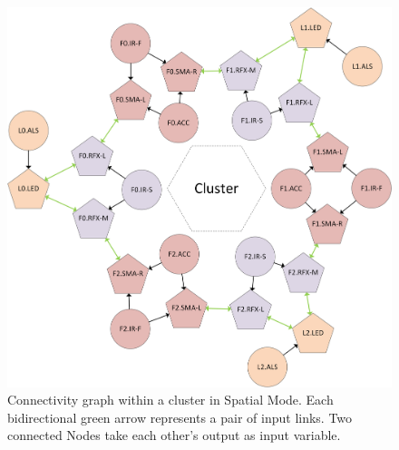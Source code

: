 \begin{figure} [!htbp]
	\centering
	\includegraphics[width=1.0\textwidth]{"fig/validations/Spatial Local Mode"}
	\caption[Connectivity graph within a cluster in Spatial Mode]{Connectivity graph within a cluster in Spatial Mode. Each bidirectional green arrow represents a pair of input links. Two connected Nodes take each other's output as input variable.}
	\label{fig:Spatial Local Modes}
\end{figure}

